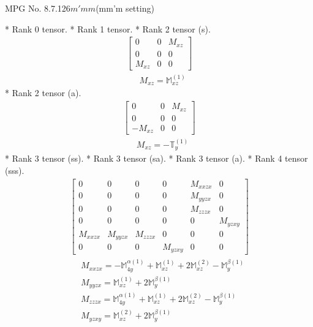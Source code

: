 \documentclass[fleqn,8pt,landscape]{jsarticle}
\begin{document}
\setcounter{MaxMatrixCols}{32}

\renewcommand{\tablename}{Table~}
\renewcommand{\figurename}{Figure~}
\begin{center}
\LARGE
MPG No. 8.7.126\quad$m'mm$\quad(mm'm setting)
\end{center}
* Rank 0 tensor.
* Rank 1 tensor.
* Rank 2 tensor (s).
\begin{align*}
\begin{bmatrix} 0 & 0 & M_{xz} \\ 0 & 0 & 0 \\ M_{xz} & 0 & 0 \end{bmatrix}
\end{align*}
\begin{align*}
& M_{xz} = \mathbb{M}_{xz}^{(1)}
\end{align*}
* Rank 2 tensor (a).
\begin{align*}
\begin{bmatrix} 0 & 0 & M_{xz} \\ 0 & 0 & 0 \\ - M_{xz} & 0 & 0 \end{bmatrix}
\end{align*}
\begin{align*}
& M_{xz} = - \mathbb{T}_{y}^{(1)}
\end{align*}
* Rank 3 tensor (ss).
* Rank 3 tensor (sa).
* Rank 3 tensor (a).
* Rank 4 tensor (sss).
\begin{align*}
\begin{bmatrix} 0 & 0 & 0 & 0 & M_{xxzx} & 0 \\ 0 & 0 & 0 & 0 & M_{yyzx} & 0 \\ 0 & 0 & 0 & 0 & M_{zzzx} & 0 \\ 0 & 0 & 0 & 0 & 0 & M_{yzxy} \\ M_{xxzx} & M_{yyzx} & M_{zzzx} & 0 & 0 & 0 \\ 0 & 0 & 0 & M_{yzxy} & 0 & 0 \end{bmatrix}
\end{align*}
\begin{align*}
& M_{xxzx} = - \mathbb{M}_{4y}^{\alpha(1)} + \mathbb{M}_{xz}^{(1)} + 2 \mathbb{M}_{xz}^{(2)} - \mathbb{M}_{y}^{\beta(1)} \\
& M_{yyzx} = \mathbb{M}_{xz}^{(1)} + 2 \mathbb{M}_{y}^{\beta(1)} \\
& M_{zzzx} = \mathbb{M}_{4y}^{\alpha(1)} + \mathbb{M}_{xz}^{(1)} + 2 \mathbb{M}_{xz}^{(2)} - \mathbb{M}_{y}^{\beta(1)} \\
& M_{yzxy} = \mathbb{M}_{xz}^{(2)} + 2 \mathbb{M}_{y}^{\beta(1)}
\end{align*}
\end{document}
